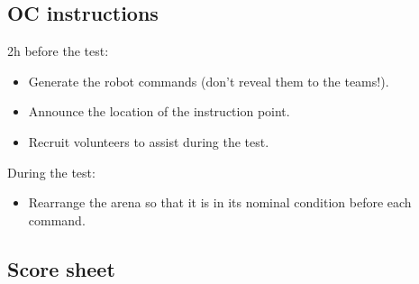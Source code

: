 \subsection*{OC instructions}

2h before the test:
\begin{itemize}
	\item Generate the robot commands (don't reveal them to the teams!).
	\item Announce the location of the instruction point.
	\item Recruit volunteers to assist during the test.
\end{itemize}

\noindent During the test:
\begin{itemize}[nosep]
	\item Rearrange the arena so that it is in its nominal condition before each command.
\end{itemize}

\subsection*{Score sheet}


